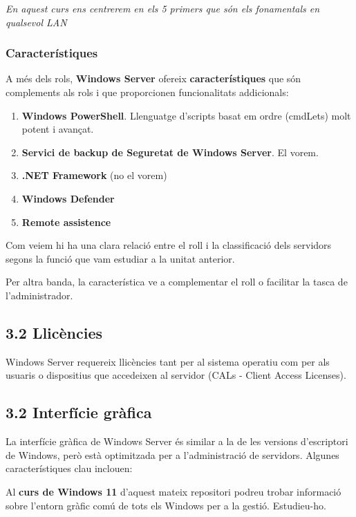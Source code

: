 \documentclass[
  a4paper,
]{article}
\begin{document}
\emph{En aquest curs ens centrerem en els 5 primers que són els
fonamentals en qualsevol LAN}

\subsubsection{Característiques}\label{caracteruxedstiques}

A més dels rols, \textbf{Windows Server} ofereix
\textbf{característiques} que són complements als rols i que
proporcionen funcionalitats addicionals:

\begin{enumerate}
\def\labelenumi{\arabic{enumi}.}
\item
  \textbf{Windows PowerShell}. Llenguatge d'scripts basat em ordre
  (cmdLets) molt potent i avançat.
\item
  \textbf{Servici de backup de Seguretat de Windows Server}. El vorem.
\item
  \textbf{.NET Framework} (no el vorem)
\item
  \textbf{Windows Defender}
\item
  \textbf{Remote assistence}
\end{enumerate}

Com veiem hi ha una clara relació entre el roll i la classificació dels
servidors segons la funció que vam estudiar a la unitat anterior.

Per altra banda, la característica ve a complementar el roll o facilitar
la tasca de l'administrador.

\subsection{3.2 Llicències}\label{llicuxe8ncies}

Windows Server requereix llicències tant per al sistema operatiu com per
als usuaris o dispositius que accedeixen al servidor (CALs - Client
Access Licenses).

\subsection{3.2 Interfície gràfica}\label{interfuxedcie-gruxe0fica}

La interfície gràfica de Windows Server és similar a la de les versions
d'escriptori de Windows, però està optimitzada per a l'administració de
servidors. Algunes característiques clau inclouen:

Al \textbf{curs de Windows 11} d'aquest mateix repositori podreu trobar
informació sobre l'entorn gràfic comú de tots els Windows per a la
gestió. Estudieu-ho.
\end{document}
